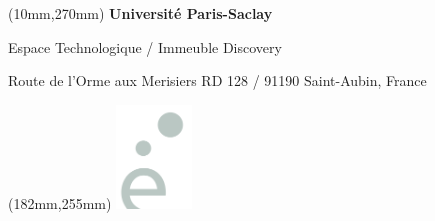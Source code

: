 \begin{textblock*}{161mm}(10mm,270mm)
\color{bordeau}
{\bf\noindent Université Paris-Saclay	         }

\noindent Espace Technologique / Immeuble Discovery 

\noindent Route de l’Orme aux Merisiers RD 128 / 91190 Saint-Aubin, France 
\end{textblock*}

\begin{textblock*}{20mm}(182mm,255mm)
\includegraphics[width=20mm]{ed_doc/UPSACLAY-petit}
\end{textblock*}



\restoregeometry 

